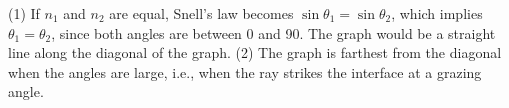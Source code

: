 (1) If $n_1$ and $n_2$ are equal, Snell's law becomes $\sin\theta_1=\sin\theta_2$, which implies
$\theta_1=\theta_2$, since both angles are between 0 and 90\degunit. The graph would be a straight
line along the diagonal of the graph. (2) The graph is farthest from the diagonal when the angles
are large, i.e., when the ray strikes the interface at a grazing angle.



